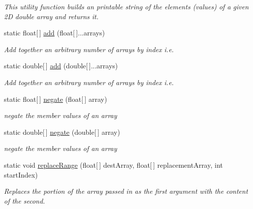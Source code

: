\begin{DoxyCompactItemize}
\begin{DoxyCompactList}\small\item\em This utility function builds an printable string of the elements (values) of a given 2\-D double array and returns it. \end{DoxyCompactList}\item 
static float\mbox{[}$\,$\mbox{]} \hyperlink{classuk_1_1ac_1_1dmu_1_1iesd_1_1cascade_1_1util_1_1_array_utils_a612aaab54beb089a4bc467e0fe359d4a}{add} (float\mbox{[}$\,$\mbox{]}...arrays)
\begin{DoxyCompactList}\small\item\em Add together an arbitrary number of arrays by index i.\-e. \end{DoxyCompactList}\item 
static double\mbox{[}$\,$\mbox{]} \hyperlink{classuk_1_1ac_1_1dmu_1_1iesd_1_1cascade_1_1util_1_1_array_utils_af12f9b4f93882451a2fda113a04437bb}{add} (double\mbox{[}$\,$\mbox{]}...arrays)
\begin{DoxyCompactList}\small\item\em Add together an arbitrary number of arrays by index i.\-e. \end{DoxyCompactList}\item 
static float\mbox{[}$\,$\mbox{]} \hyperlink{classuk_1_1ac_1_1dmu_1_1iesd_1_1cascade_1_1util_1_1_array_utils_a1813e4f2d69c4b1f2dde2dee58f1aeb8}{negate} (float\mbox{[}$\,$\mbox{]} array)
\begin{DoxyCompactList}\small\item\em negate the member values of an array \end{DoxyCompactList}\item 
static double\mbox{[}$\,$\mbox{]} \hyperlink{classuk_1_1ac_1_1dmu_1_1iesd_1_1cascade_1_1util_1_1_array_utils_af6d71cb48a9bdb957734cc6081ea5b69}{negate} (double\mbox{[}$\,$\mbox{]} array)
\begin{DoxyCompactList}\small\item\em negate the member values of an array \end{DoxyCompactList}\item 
static void \hyperlink{classuk_1_1ac_1_1dmu_1_1iesd_1_1cascade_1_1util_1_1_array_utils_a2ac92883cb33d02e6ed42a7ae345d2ea}{replace\-Range} (float\mbox{[}$\,$\mbox{]} dest\-Array, float\mbox{[}$\,$\mbox{]} replacement\-Array, int start\-Index)
\begin{DoxyCompactList}\small\item\em Replaces the portion of the array passed in as the first argument with the content of the second. \end{DoxyCompactList}\item 

\end{DoxyCompactItemize}
